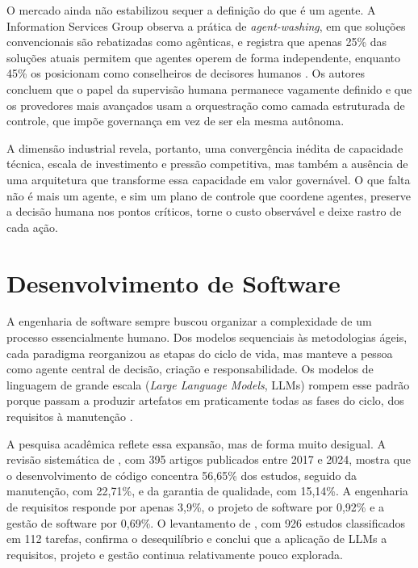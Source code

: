 O mercado ainda não estabilizou sequer a definição do que é um agente. A Information Services Group observa a prática de \textit{agent-washing}, em que soluções convencionais são rebatizadas como agênticas, e registra que apenas 25\% das soluções atuais permitem que agentes operem de forma independente, enquanto 45\% os posicionam como conselheiros de decisores humanos \cite{isg2025agentic}. Os autores concluem que o papel da supervisão humana permanece vagamente definido e que os provedores mais avançados usam a orquestração como camada estruturada de controle, que impõe governança em vez de ser ela mesma autônoma.

A dimensão industrial revela, portanto, uma convergência inédita de capacidade técnica, escala de investimento e pressão competitiva, mas também a ausência de uma arquitetura que transforme essa capacidade em valor governável. O que falta não é mais um agente, e sim um plano de controle que coordene agentes, preserve a decisão humana nos pontos críticos, torne o custo observável e deixe rastro de cada ação.

\section{Desenvolvimento de Software}\label{sec:2.2}

A engenharia de software sempre buscou organizar a complexidade de um processo essencialmente humano. Dos modelos sequenciais às metodologias ágeis, cada paradigma reorganizou as etapas do ciclo de vida, mas manteve a pessoa como agente central de decisão, criação e responsabilidade. Os modelos de linguagem de grande escala (\textit{Large Language Models}, LLMs) rompem esse padrão porque passam a produzir artefatos em praticamente todas as fases do ciclo, dos requisitos à manutenção \cite{burte2025sdlc,zhang2026survey}.

A pesquisa acadêmica reflete essa expansão, mas de forma muito desigual. A revisão sistemática de , com 395 artigos publicados entre 2017 e 2024, mostra que o desenvolvimento de código concentra 56,65\% dos estudos, seguido da manutenção, com 22,71\%, e da garantia de qualidade, com 15,14\%. A engenharia de requisitos responde por apenas 3,9\%, o projeto de software por 0,92\% e a gestão de software por 0,69\%. O levantamento de , com 926 estudos classificados em 112 tarefas, confirma o desequilíbrio e conclui que a aplicação de LLMs a requisitos, projeto e gestão continua relativamente pouco explorada.

